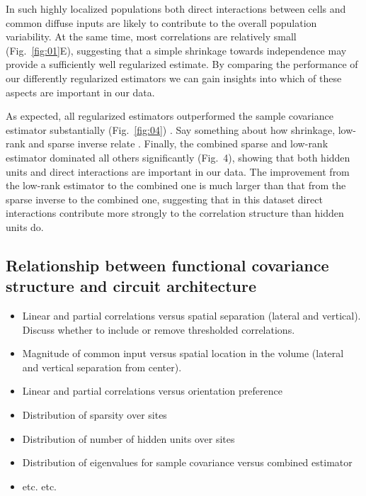 

In such highly localized populations both direct interactions between cells and common diffuse inputs are likely to contribute to the overall population variability. At the same time, most correlations are relatively small (Fig.~\ref{fig:01}E), suggesting that a simple shrinkage towards independence may provide a sufficiently well regularized estimate. By comparing the performance of our differently regularized estimators we can gain insights into which of these aspects are important in our data.

As expected, all regularized estimators outperformed the sample covariance estimator substantially (Fig.~\ref{fig:04}) . Say something about how shrinkage, low-rank and sparse inverse relate . Finally, the combined sparse and low-rank estimator dominated all others significantly (Fig.~4), showing that both hidden units and direct interactions are important in our data. The improvement from the low-rank estimator to the combined one is much larger than that from the sparse inverse to the combined one, suggesting that in this dataset direct interactions contribute more strongly to the correlation structure than hidden units do.




\subsection*{Relationship between functional covariance structure and circuit architecture}



\begin{itemize}
\item Linear and partial correlations versus spatial separation (lateral and vertical). Discuss whether to include or remove thresholded correlations.
\item Magnitude of common input versus spatial location in the volume (lateral and vertical separation from center).
\item Linear and partial correlations versus orientation preference
\item Distribution of sparsity over sites
\item Distribution of number of hidden units over sites
\item Distribution of eigenvalues for sample covariance versus combined estimator
\item etc. etc. 

\end{itemize}





